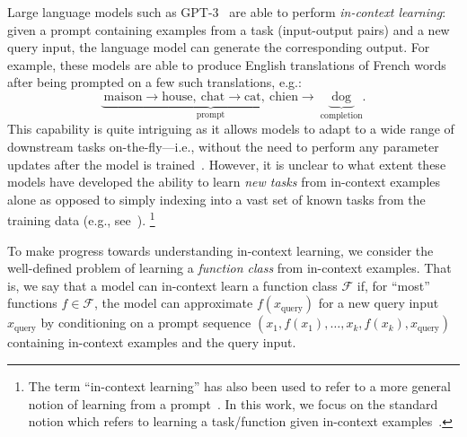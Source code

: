 Large language models such as GPT-3~\citep{brown2020language} are able to perform \emph{in-context learning}:
given a prompt containing examples from a task (input-output pairs) and a new query input, the language model can generate the corresponding output.
For example, these models are able to produce English translations of French words after being prompted on a few  such translations, e.g.:
\[\underbrace{\ \text{maison} \to \text{house},\ \text{chat} \to \text{cat},\ \text{chien} \to \ }_\text{prompt}
\underbrace{\ \text{dog}\ }_\text{completion}.\]
This capability is quite intriguing as it allows models to adapt to a wide range of downstream tasks on-the-fly---i.e., without the need to perform any parameter updates after the model is trained~\citep{brown2020language,lieber2021jurassic, rae2021scaling, black2022gpt}.
However, it is unclear to what extent these models have developed the ability to learn \emph{new tasks} from in-context examples alone as opposed to simply indexing into a vast set of known tasks from the training data (e.g., see~\citet{min2022rethinking}).
\footnote{The term ``in-context learning'' has also been used to refer to a more general notion of learning from a prompt~\citep{olsson2022context}. In this work, we focus on the standard notion which refers to learning a task/function given in-context examples~\citep{brown2020language}.}

To make progress towards understanding in-context learning, we consider the well-defined problem of learning a \emph{function class} from in-context examples.
That is, we say that a model can in-context learn a function class $\mathcal{F}$ if, for ``most'' functions $f \in \mathcal{F}$, the model can approximate $f(x_{\text{query}})$ for a new query input $x_{\text{query}}$ by conditioning on a prompt sequence $(x_1, f(x_1), \ldots,x_k, f(x_k), x_{\text{query}})$ containing in-context examples and the query input.

